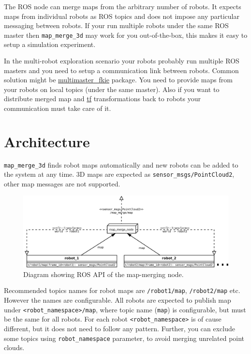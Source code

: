 The \gls{ROS} node can merge maps from the arbitrary number of robots. It expects maps from individual robots as \gls{ROS} topics and does not impose any particular messaging between robots. If your run multiple robots under the same \gls{ROS} master then \texttt{map\_merge\_3d} may work for you out-of-the-box, this makes it easy to setup a simulation experiment.

In the multi-robot exploration scenario your robots probably run multiple \gls{ROS} masters and you need to setup a communication link between robots. Common solution might be \href{http://wiki.ros.org/multimaster_fkie}{multimaster\_fkie} package. You need to provide maps from your robots on local topics (under the same master). Also if you want to distribute merged map and \href{http://wiki.ros.org/tf}{tf} transformations back to robots your communication must take care of it.

\section{Architecture}

\texttt{map\_merge\_3d} finds robot maps automatically and new robots can be added to the system at any time. \gls{3D} maps are expected as \texttt{sensor\_msgs/PointCloud2}, other map messages are not supported.

\begin{figure}
    \centering
    \includegraphics[width=\textwidth]{../img/architecture.pdf}
    \caption[The architecture of the \texttt{map\_merge\_node}]{Diagram showing \gls{ROS} \gls{API} of the map-merging node.}
    \label{fig:architecture}
\end{figure}

Recommended topics names for robot maps are \texttt{/robot1/map}, \texttt{/robot2/map} etc. However the names are configurable. All robots are expected to publish map under \texttt{<robot\_namespace>/map}, where topic name (\texttt{map}) is configurable, but must be the same for all robots. For each robot \texttt{<robot\_namespace>} is of cause different, but it does not need to follow any pattern. Further, you can exclude some topics using \texttt{robot\_namespace} parameter, to avoid merging unrelated point clouds.

